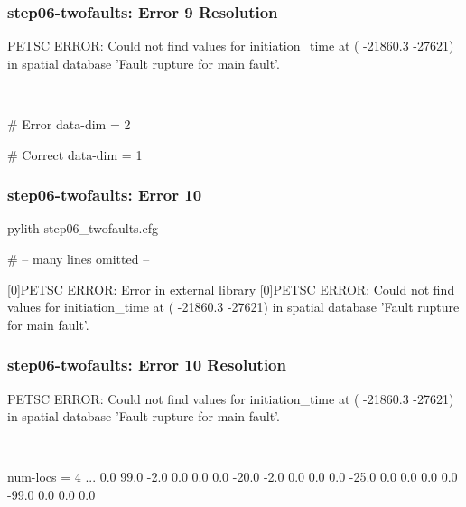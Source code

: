 \documentclass[aspectratio=169]{beamer}
\begin{document}
\begin{frame}[t,fragile]
  \frametitle{{\ttfamily step06-twofaults}: Error 9 Resolution}

  \tserror
  \begin{bashcode}
[0]PETSC ERROR: Could not find values for initiation_time at (  -21860.3  -27621) in spatial database 'Fault rupture for main fault'.
  \end{bashcode}

  \pause\\[1pt]

  \begin{cfgcode}
    # Error
    data-dim = 2
    
    # Correct
    data-dim = 1
  \end{cfgcode}

\end{frame}


\begin{frame}[fragile]
  \frametitle{{\ttfamily step06-twofaults}: Error 10}

\begin{bashcode}
pylith step06_twofaults.cfg

# -- many lines omitted --

[0]PETSC ERROR: Error in external library
[0]PETSC ERROR: Could not find values for initiation_time at (  -21860.3  -27621) in spatial database 'Fault rupture for main fault'.
\end{bashcode}

\end{frame}


\begin{frame}[t,fragile]
  \frametitle{{\ttfamily step06-twofaults}: Error 10 Resolution}

  \tserror
  \begin{bashcode}
[0]PETSC ERROR: Could not find values for initiation_time at (  -21860.3  -27621) in spatial database 'Fault rupture for main fault'.
  \end{bashcode}

  \pause\\[1pt]

  \begin{cfgcode}
num-locs = 4
...
0.0   99.0     -2.0       0.0   0.0
0.0  -20.0     -2.0       0.0   0.0
0.0  -25.0      0.0       0.0   0.0
0.0  -99.0      0.0       0.0   0.0
  \end{cfgcode}

\end{frame}
\end{document}
